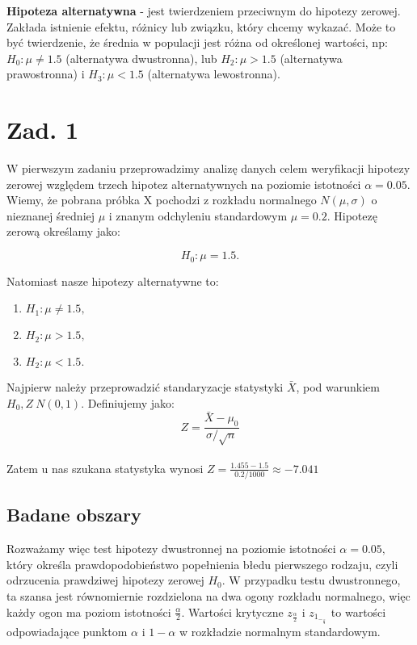 \documentclass[12pt,letterpaper]{article}
\theoremstyle{definition}
\begin{document}
\textbf{Hipoteza alternatywna} - jest twierdzeniem przeciwnym do hipotezy zerowej. Zakłada istnienie efektu, różnicy lub związku, który chcemy wykazać. Może to być twierdzenie, że średnia w populacji jest różna od określonej wartości, np: $H_0 : \mu  \neq 1.5$ (alternatywa dwustronna), lub $H_2: \mu > 1.5$ (alternatywa prawostronna) i $H_3: \mu < 1.5$ (alternatywa lewostronna).

\section{Zad. 1}
W pierwszym zadaniu przeprowadzimy analizę danych celem weryfikacji hipotezy zerowej względem trzech hipotez alternatywnych na poziomie istotności $\alpha = 0.05.$ Wiemy, że pobrana próbka X pochodzi z rozkładu normalnego $N(\mu,\sigma)$ o nieznanej średniej $\mu$ i znanym odchyleniu standardowym $\mu = 0.2$. Hipotezę zerową określamy jako:

\begin{equation}
    H_0: \mu = 1.5.
\end{equation} 


Natomiast nasze hipotezy alternatywne to:
\begin{enumerate}
    \centering
    \item $H_1: \mu \neq 1.5,$
    \item $H_2: \mu > 1.5,$
    \item $H_2: \mu < 1.5.$
\end{enumerate}

Najpierw należy przeprowadzić standaryzacje statystyki $\bar X$, pod warunkiem $H_0, Z~N(0,1).$ Definiujemy jako:
\begin{equation}
    Z= \frac{\bar X - \mu_0}{\sigma / \sqrt{n}}
\end{equation} 
\\

Zatem u nas szukana statystyka wynosi $Z=\frac{1.455 - 1.5}{0.2 / 1000}\approx -7.041$
\subsection{Badane obszary}

Rozważamy więc test hipotezy dwustronnej na poziomie istotności $ \alpha = 0.05,$
który określa prawdopodobieństwo popełnienia błedu pierwszego rodzaju, czyli
odrzucenia prawdziwej hipotezy zerowej $H_0$. W przypadku testu dwustronnego,
ta szansa jest równomiernie rozdzielona na dwa ogony rozkładu normalnego,
więc każdy ogon ma poziom istotności $\frac{\alpha}{2}$. Wartości krytyczne $z_\frac{\alpha}{2}$ i $z_1_-_\frac{\alpha}{2}$ to wartości odpowiadające punktom $\alpha$ i $1 -\alpha$ w rozkładzie normalnym standardowym.\\
\end{document}
